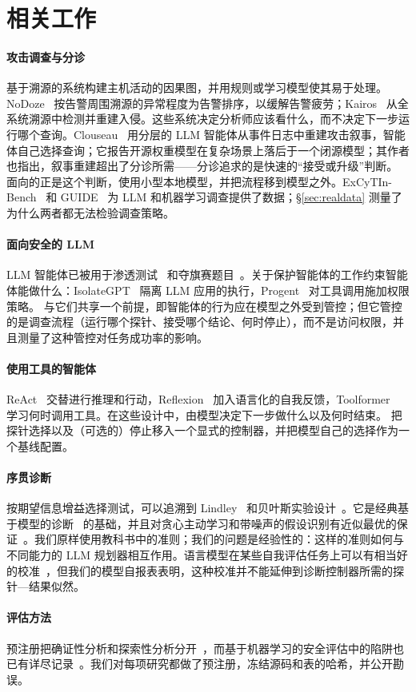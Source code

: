 \section{相关工作}
\label{sec:related}

\paragraph{攻击调查与分诊} 基于溯源的系统构建主机活动的因果图，并用规则或学习模型使其易于处理。NoDoze~\citep{nodoze} 按告警周围溯源的异常程度为告警排序，以缓解告警疲劳；Kairos~\citep{kairos} 从全系统溯源中检测并重建入侵。这些系统决定分析师应该看什么，而不决定下一步运行哪个查询。Clouseau~\citep{clouseau} 用分层的 LLM 智能体从事件日志中重建攻击叙事，智能体自己选择查询；它报告开源权重模型在复杂场景上落后于一个闭源模型；其作者也指出，叙事重建超出了分诊所需——分诊追求的是快速的“接受或升级”判断。\hesp{} 面向的正是这个判断，使用小型本地模型，并把流程移到模型之外。ExCyTIn-Bench~\citep{excytin} 和 GUIDE~\citep{guide} 为 LLM 和机器学习调查提供了数据；\S\ref{sec:realdata} 测量了为什么两者都无法检验调查策略。

\paragraph{面向安全的 LLM} LLM 智能体已被用于渗透测试~\citep{pentestgpt} 和夺旗赛题目~\citep{cybench}。关于保护智能体的工作约束智能体能做什么：IsolateGPT~\citep{isolategpt} 隔离 LLM 应用的执行，Progent~\citep{progent} 对工具调用施加权限策略。\hesp{} 与它们共享一个前提，即智能体的行为应在模型之外受到管控；但它管控的是调查流程（运行哪个探针、接受哪个结论、何时停止），而不是访问权限，并且测量了这种管控对任务成功率的影响。

\paragraph{使用工具的智能体} ReAct~\citep{react} 交替进行推理和行动，Reflexion~\citep{reflexion} 加入语言化的自我反馈，Toolformer~\citep{toolformer} 学习何时调用工具。在这些设计中，由模型决定下一步做什么以及何时结束。\hesp{} 把探针选择以及（可选的）停止移入一个显式的控制器，并把模型自己的选择作为一个基线配置。

\paragraph{序贯诊断} 按期望信息增益选择测试，可以追溯到 Lindley~\citep{lindley1956} 和贝叶斯实验设计~\citep{chaloner1995}。它是经典基于模型的诊断~\citep{dekleer1987} 的基础，并且对贪心主动学习和带噪声的假设识别有近似最优的保证~\citep{dasgupta2004,golovin2010}。我们原样使用教科书中的准则；我们的问题是经验性的：这样的准则如何与不同能力的 LLM 规划器相互作用。语言模型在某些自我评估任务上可以有相当好的校准~\citep{kadavath2022}，但我们的模型自报表表明，这种校准并不能延伸到诊断控制器所需的探针—结果似然。

\paragraph{评估方法} 预注册把确证性分析和探索性分析分开~\citep{nosek2018}，而基于机器学习的安全评估中的陷阱也已有详尽记录~\citep{arp2022dos}。我们对每项研究都做了预注册，冻结源码和表的哈希，并公开勘误。
